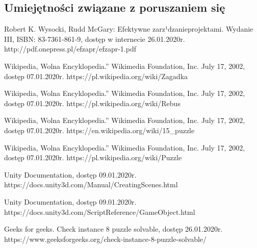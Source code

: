 \documentclass[oneside,polski,logo]{amuthesis}
\begin{document}
\subsection{Umiejętności związane z poruszaniem się}

\begin{thebibliography}{9}
Robert K. Wysocki, Rudd McGary: Efektywne zarz¹dzanieprojektami. Wydanie III, ISBN: 83-7361-861-9, dostęp w internecie 26.01.2020r.
http://pdf.onepress.pl/efzapr/efzapr-1.pdf

Wikipedia, Wolna Encyklopedia.” Wikimedia Foundation, Inc. July 17, 2002, dostęp 07.01.2020r.
https://pl.wikipedia.org/wiki/Zagadka

Wikipedia, Wolna Encyklopedia.” Wikimedia Foundation, Inc. July 17, 2002, dostęp 07.01.2020r.
https://pl.wikipedia.org/wiki/Rebus

Wikipedia, Wolna Encyklopedia.” Wikimedia Foundation, Inc. July 17, 2002, dostęp 07.01.2020r.
https://en.wikipedia.org/wiki/15\_puzzle

Wikipedia, Wolna Encyklopedia.” Wikimedia Foundation, Inc. July 17, 2002, dostęp 07.01.2020r.
https://pl.wikipedia.org/wiki/Puzzle

Unity Documentation, dostęp 09.01.2020r.
https://docs.unity3d.com/Manual/CreatingScenes.html

Unity Documentation, dostęp 09.01.2020r.
https://docs.unity3d.com/ScriptReference/GameObject.html

Geeks for geeks. Check instance 8 puzzle solvable, dostęp 26.01.2020r.
https://www.geeksforgeeks.org/check-instance-8-puzzle-solvable/

\end{thebibliography}
\end{document}
